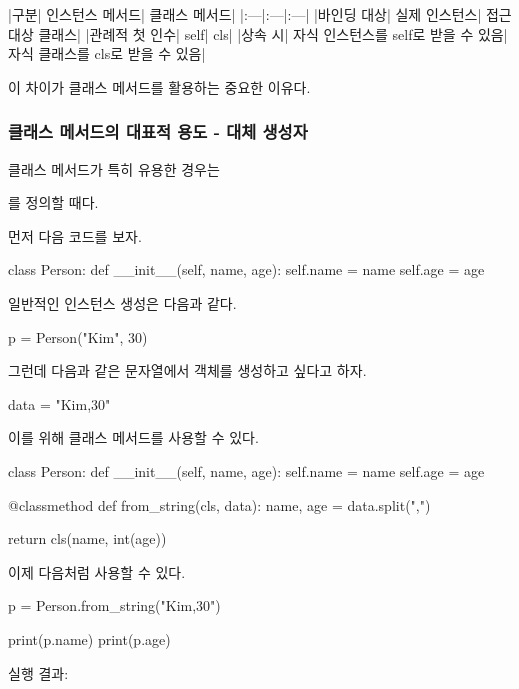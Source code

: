 \begin{dhktable}
|구분|	인스턴스 메서드|	클래스 메서드|
|:---|:---|:---|
|바인딩 대상|	실제 인스턴스|	접근 대상 클래스|
|관례적 첫 인수|	self|	cls|
|상속 시|	자식 인스턴스를 self로 받을 수 있음|	자식 클래스를 cls로 받을 수 있음|
\end{dhktable}

이 차이가 클래스 메서드를 활용하는 중요한 이유다.

\subsubsection{클래스 메서드의 대표적 용도 - 대체 생성자}

클래스 메서드가 특히 유용한 경우는 

를 정의할 때다.

먼저 다음 코드를 보자.

\begin{dhkcode}
class Person:
    def __init__(self, name, age):
        self.name = name
        self.age = age
\end{dhkcode}

일반적인 인스턴스 생성은 다음과 같다.

\begin{dhkcode}
p = Person("Kim", 30)
\end{dhkcode}

그런데 다음과 같은 문자열에서 객체를 생성하고 싶다고 하자.

\begin{dhkcode}
data = "Kim,30"
\end{dhkcode}

이를 위해 클래스 메서드를 사용할 수 있다.

\begin{dhkcode}
class Person:
    def __init__(self, name, age):
        self.name = name
        self.age = age

    @classmethod
    def from_string(cls, data):
        name, age = data.split(",")

        return cls(name, int(age))
\end{dhkcode}

이제 다음처럼 사용할 수 있다.

\begin{dhkcode}
p = Person.from_string("Kim,30")

print(p.name)
print(p.age)
\end{dhkcode}

실행 결과:

